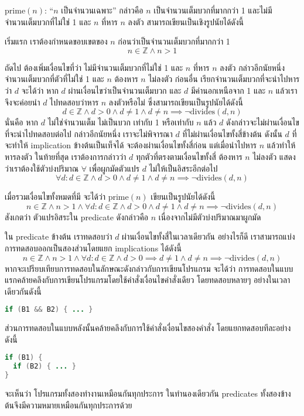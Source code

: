 \begin{example}
$\mathrm{prime}(n)$: ``$n$ เป็นจำนวนเฉพาะ'' กล่าวคือ $n$ เป็นจำนวนเต็มบวกที่มากกว่า 1 และไม่มีจำนวนเต็มบวกที่ไม่ใช่ 1 และ $n$ ที่หาร $n$ ลงตัว สามารถเขียนเป็นเชิงรูปนัยได้ดังนี้

เริ่มแรก เราต้องกำหนดขอบเขตของ $n$ ก่อนว่าเป็นจำนวนเต็มบวกที่มากกว่า 1 \[n\in\mathbb{Z}\wedge n>1\]

ถัดไป ต้องเพิ่มเงื่อนไขที่ว่า ไม่มีจำนวนเต็มบวกที่ไม่ใช่ 1 และ $n$ ที่หาร $n$ ลงตัว \enskip กล่าวอีกนัยหนึ่ง จำนวนเต็มบวกที่ตัวที่ไม่ใช่ 1 และ $n$ ต้องหาร $n$ ไม่ลงตัว \enskip ก่อนอื่น เรียกจำนวนเต็มบวกที่จะนำไปหารว่า $d$ จะได้ว่า หาก $d$ ผ่านเงื่อนไขว่าเป็นจำนวนเต็มบวก และ $d$ มีค่านอกเหนือจาก 1 และ $n$ แล้วเราจึงจะค่อยนำ $d$ ไปทดสอบว่าหาร $n$ ลงตัวหรือไม่ ซึ่งสามารถเขียนเป็นรูปนัยได้ดังนี้ \[d\in\mathbb{Z}\wedge d>0\wedge d\neq 1\wedge d\neq n \implies \neg\mathrm{divides}(d,n)\] นั่นคือ หาก $d$ ไม่ใช่จำนวนเต็ม ไม่เป็นบวก เท่ากับ 1 หรือเท่ากับ $n$ แล้ว $d$ ดังกล่าวจะไม่ผ่านเงื่อนไขที่จะนำไปทดสอบต่อไป \enskip กล่าวอีกนัยหนึ่ง เราจะไม่พิจารณา $d$ ที่ไม่ผ่านเงื่อนไขทั้งสี่ข้างต้น \enskip ดังนั้น $d$ ที่จะทำให้ implication ข้างต้นเป็นเท็จได้ จะต้องผ่านเงื่อนไขทั้งสี่ก่อน แต่เมื่อนำไปหาร $n$ แล้วทำให้หารลงตัว \enskip ในท้ายที่สุด เราต้องการกล่าวว่า $d$ ทุกตัวที่ตรงตามเงื่อนไขทั้งสี่ ต้องหาร $n$ ไม่ลงตัว แสดงว่าเราต้องใช้ตัวบ่งปริมาณ $\forall$ เพื่อผูกมัดตัวแปร $d$ ไม่ให้เป็นอิสระอีกต่อไป \[\forall d: d\in\mathbb{Z}\wedge d>0\wedge d\neq 1\wedge d\neq n \implies \neg\mathrm{divides}(d,n)\]

เมื่อรวมเงื่อนไขทั้งหมดที่มี จะได้ว่า $\mathrm{prime}(n)$ เขียนเป็นรูปนัยได้ดังนี้ \[n\in\mathbb{Z}\wedge n>1\wedge\forall d: d\in\mathbb{Z}\wedge d>0\wedge d\neq 1\wedge d\neq n \implies \neg\mathrm{divides}(d,n)\]
สังเกตว่า ตัวแปรอิสระใน predicate ดังกล่าวคือ $n$ เนื่องจากไม่มีตัวบ่งปริมาณมาผูกมัด

ใน predicate ข้างต้น เราทดสอบว่า $d$ ผ่านเงื่อนไขทั้งสี่ในเวลาเดียวกัน \enskip อย่างไรก็ดี เราสามารถแบ่งการทดสอบออกเป็นสองส่วนโดยแยก implications ได้ดังนี้ \[n\in\mathbb{Z}\wedge n>1\wedge\forall d: d\in\mathbb{Z}\wedge d>0 \implies d\neq 1\wedge d\neq n \implies \neg\mathrm{divides}(d,n)\]
หากจะเปรียบเทียบการทดสอบในลักษณะดังกล่าวกับการเขียนโปรแกรม จะได้ว่า การทดสอบในแบบแรกคล้ายคลึงกับการเขียนโปรแกรมโดยใช้คำสั่งเงื่อนไขคำสั่งเดียว โดยทดสอบหลายๆ อย่างในเวลาเดียวกันดังนี้
\begin{lstlisting}[language=Java,numbers=none]
if (B1 && B2) { ... }
\end{lstlisting}
ส่วนการทดสอบในแบบหลังนั้นคล้ายคลึงกับการใช้คำสั่งเงื่อนไขสองคำสั่ง โดยแยกทดสอบทีละอย่างดังนี้
\begin{lstlisting}[language=Java,numbers=none]
if (B1) {
  if (B2) { ... }
}
\end{lstlisting}
จะเห็นว่า โปรแกรมทั้งสองทำงานเหมือนกันทุกประการ \enskip ในทำนองเดียวกัน predicates ทั้งสองข้างต้นจึงมีความหมายเหมือนกันทุกประการด้วย


\end{example}
